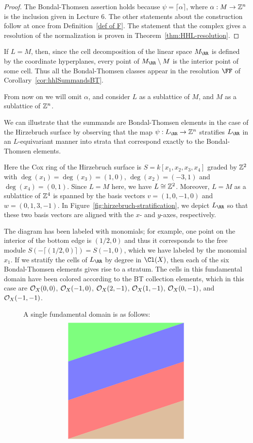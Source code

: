 \documentclass{amsart}
\begin{document}
 \begin{proof} 
 The Bondal-Thomsen assertion holds because $\psi = \lceil \alpha \rceil$, where $\alpha:M\rightarrow \mathbb Z^n$ is the
 inclusion given in Lecture 6. 
 The other statements about the construction follow at once from Definition~\ref{def of F}. The statement that the complex gives a resolution of the normalization is proven in Theorem~\ref{thm:HHL-resolution}. 
  \end{proof}

\begin{example}
If $L=M$, then, since the cell decomposition of the linear space $M_{\RR}$ is defined by the coordinate
hyperplanes, every point of $M_\RR\setminus M$ is the interior point of some cell. Thus all  the Bondal-Thomsen classes appear in the resolution $\FF$ of Corollary~\ref{cor:hhlSummandsBT}.

From now on we will omit $\alpha$, and consider $L$ as a sublattice of $M$, and $M$ as a sublattice of $\mathbb Z^n$.

\label{ex:resHirzebruch3}
  We can illustrate that the summands are Bondal-Thomsen elements in the case of the Hirzebruch surface by observing that the map $\psi:L_{\RR} \rightarrow \ZZ^n$ stratifies $L_{\RR}$ in an $L$-equivariant manner into strata that correspond exactly to the Bondal-Thomsen elements.

  Here the Cox ring of the Hirzebruch surface is $S=k[x_1,x_2,x_3,x_4]$ graded by $\mathbb Z^2$ with $\deg(x_1)=\deg(x_3) = (1,0)$, $\deg(x_2)=(-3,1)$ and $\deg(x_4)=(0,1)$. Since $L=M$ here, we have $L\cong \mathbb Z^2$. Moreover, $L=M$ as a sublattice of $\mathbb Z^4$ is spanned by the basis vectors $v=(1,0,-1,0)$ and $w=(0,1,3,-1)$. In Figure~\ref{fig:hirzebruch-stratification}, we depict $L_{\RR}$ so that these two basis vectors are aligned with the $x$- and $y$-axes, respectively.
  
The diagram has been labeled with monomials; for example, one point on the interior of the bottom edge is $(1/2,0)$ and thus it corresponds to the free module $S(-\lceil(1/2,0)\rceil) = S(-1,0)$, which we have labeled by the monomial $x_1$. If we stratify the cells of $L_{\RR}$ by degree in $\Cl(X)$, then each of the six Bondal-Thomsen elements gives rise to a stratum.
The cells in this fundamental domain have been colored according to the BT collection elements, which in this case are ${\mathcal O}_{X}(0,0)$, ${\mathcal O}_{X}(-1,0)$, ${\mathcal O}_{X}(2,-1)$, ${\mathcal O}_{X}(1,-1)$, ${\mathcal O}_{X}(0,-1)$, and ${\mathcal O}_{X}(-1,-1)$.

\begin{figure}
  A single fundamental domain is as follows:
\[
\begin{tikzpicture}[scale=2]
\fill[opacity=0.5, green] (0,2) -- (0,3) -- (3,3) -- cycle;
\fill[opacity=0.5, blue] (0,1) -- (0,2) -- (3,3) -- (3,2) -- (0,1);
\fill[opacity=0.5, red] (0,0) -- (0,1) -- (3,2) -- (3,1) -- (0,0);
\fill[opacity=0.5, brown] (0,0) -- (3,1) -- (3,0) -- (0,0);


\end{tikzpicture}\]
\end{figure}
\end{example}
\end{document}
